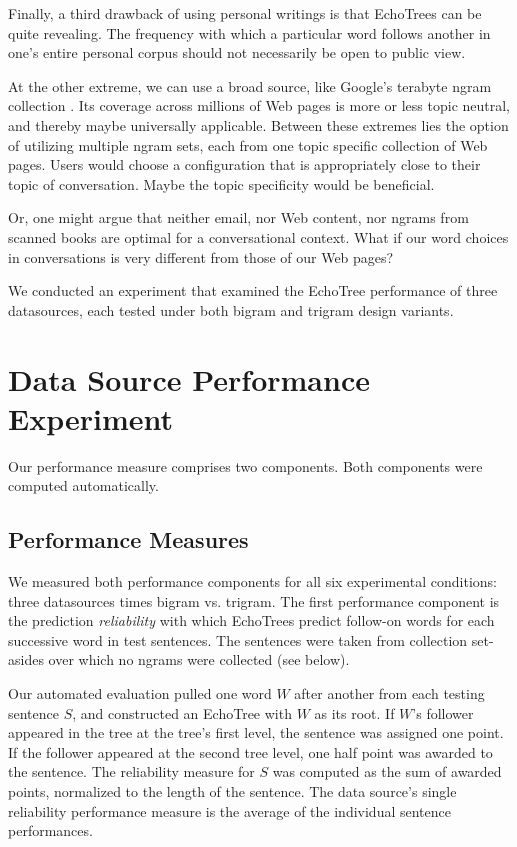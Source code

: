 \documentclass{sigchi}
\begin{document}
Finally, a third drawback of using personal writings is that EchoTrees
can be quite revealing. The frequency with which a particular word
follows another in one's entire personal corpus should not necessarily
be open to public view.

At the other extreme, we can use a broad source, like Google's
terabyte ngram collection \cite{****}. Its coverage across millions of
Web pages is more or less topic neutral, and thereby maybe universally
applicable. Between these extremes lies the option of utilizing
multiple ngram sets, each from one topic specific collection of Web
pages. Users would choose a configuration that is appropriately close
to their topic of conversation. Maybe the topic specificity would be
beneficial. 

Or, one might argue that neither email, nor Web content, nor ngrams
from scanned books \cite{anc} are optimal for a conversational
context. What if our word choices in conversations is very different
from those of our Web pages?

We conducted an experiment that examined the EchoTree performance of
three datasources, each tested under both bigram and trigram design
variants.

\section{Data Source Performance Experiment}

Our performance measure comprises two components. Both components were
computed automatically.

\subsection{Performance Measures}

We measured both performance components for all six experimental
conditions: three datasources times bigram vs. trigram. The first
performance component is the prediction {\em reliability} with which
EchoTrees predict follow-on words for each successive word in test
sentences. The sentences were taken from collection set-asides over
which no ngrams were collected (see below).

Our automated evaluation pulled one word $W$ after another from each
testing sentence $S$, and constructed an EchoTree with $W$ as its
root. If $W$'s follower appeared in the tree at the tree's first
level, the sentence was assigned one point. If the follower appeared
at the second tree level, one half point was awarded to the
sentence. The reliability measure for $S$ was computed as the sum of
awarded points, normalized to the length of the sentence. The data
source's single reliability performance measure is the average of the
individual sentence performances.
\end{document}

